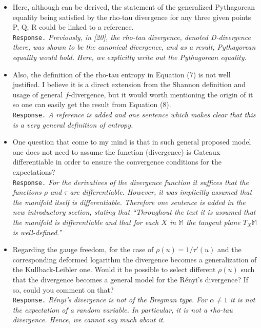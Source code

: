 \documentclass[a4paper,12pt]{article}
\newcommand{\Mo}{\mathbb M}
\begin{document}
\begin{itemize}
\item Here, although can be derived, the statement of the generalized Pythagorean equality being satisfied by the rho-tau
divergence for any three given points P, Q, R could be linked to a reference. \\
{\tt Response.} {\it Previously, in [20], the rho-tau divergence, denoted D-divergence there, was shown to be the canonical divergence, and as a result,  Pythagorean equality would hold. Here, we explicitly write out the Pythagorean equality.}

\item Also, the definition of the rho-tau entropy in Equation (7) is not well
justified. I believe it is a direct extension from the Shannon definition and
usage of general $f$-divergence, but it would worth mentioning the origin of it
so one can easily get the result from Equation (8). \\
{\tt Response.} {\it A reference is added and one sentence which makes clear that this
 is a very general definition of entropy.}

\item One question that come to my mind is that in such general proposed
model one does not need to assume the function (divergence) is Gateaux
differentiable in order to ensure the convergence conditions for the expectations? \\
{\tt Response.} {\it For the derivatives of the divergence function it suffices that
 the functions $\rho$ and $\tau$ are differentiable. However, it was implicitly assumed that
 the manifold itself is differentiable. Therefore one sentence is added in the new introductory
 section, stating that ``Throughout the text it is assumed that the manifold is differentiable
 and that for each $X$ in $\Mo$ the tangent plane $T_X\Mo$ is well-defined.''
 }

\item Regarding the gauge freedom, for the case of $\rho(u)=1/\tau'(u)$
and the corresponding deformed logarithm the divergence becomes a generalization of the
Kullback-Leibler one. Would it be possible to select different $\rho(u)$ such that
the divergence becomes a general model for the R\'enyi’s divergence? If so,
could you comment on that? \\
{\tt Response.} {\it R\'enyi’s divergence is not of the Bregman type. For $\alpha\not=1$
 it is not the expectation of a random variable. In particular, it is not a rho-tau divergence.
 Hence, we cannot say much about it. }
 

\end{itemize}
\end{document}
